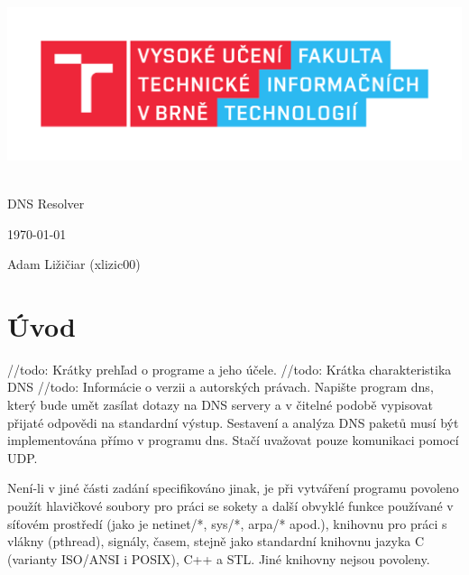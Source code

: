 \documentclass[a4paper, 11pt]{article}
\begin{document}
	\begin{titlepage}
		\begin{center}
			\includegraphics[width=0.77\linewidth]{res/logo_FIT.pdf} \\


			 \\
			\LARGE{DNS Resolver} \\
		\end{center}

		\begin{minipage}[b]{0.4 \textwidth}
			\raggedright
			{\Large \today}
		\end{minipage}
		\hfill
		\begin{minipage}[b]{0.6 \textwidth}
			\raggedleft
			\Large
			Adam Ližičiar (xlizic00)\\
		\end{minipage}		
	\end{titlepage}

	\setcounter{page}{1}
	\tableofcontents
	\clearpage

	\setcounter{page}{1}
	
	\section{Úvod}
	//todo: Krátky prehľad o programe a jeho účele.
	//todo: Krátka charakteristika DNS
	//todo: Informácie o verzii a autorských právach.
	Napište program dns, který bude umět zasílat dotazy na DNS servery a v čitelné podobě vypisovat přijaté odpovědi na standardní výstup. Sestavení a analýza DNS paketů musí být implementována přímo v programu dns. Stačí uvažovat pouze komunikaci pomocí UDP.



	Není-li v jiné části zadání specifikováno jinak, je při vytváření programu povoleno použít hlavičkové soubory pro práci se sokety a další obvyklé funkce používané v síťovém prostředí (jako je netinet/*, sys/*, arpa/* apod.), knihovnu pro práci s vlákny (pthread), signály, časem, stejně jako standardní knihovnu jazyka C (varianty ISO/ANSI i POSIX), C++ a STL. Jiné knihovny nejsou povoleny.
\end{document}
